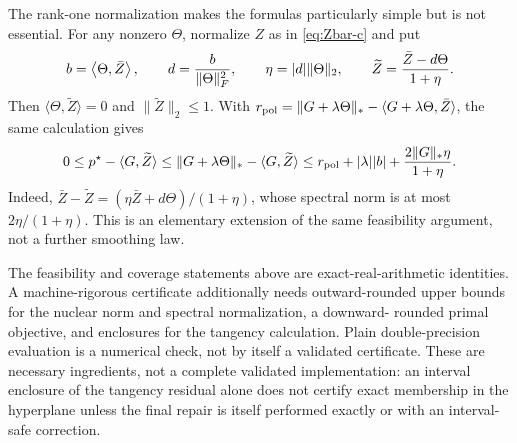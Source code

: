 \begin{remark}
\label{rem:general-normal-repair}
The rank-one normalization makes the formulas particularly simple but is
not essential.  For any nonzero \(\Theta\), normalize \(Z\) as in
\eqref{eq:Zbar-c} and put
\[
 b=\left\langle \Theta,\bar Z\right\rangle,\qquad
 d=\frac{b}{\|\Theta\|_F^2},\qquad
 \eta=|d|\|\Theta\|_2,\qquad
 \widetilde Z=\frac{\bar Z-d\Theta}{1+\eta}.
\]
Then \(\langle\Theta,\widetilde Z\rangle=0\) and
\(\|\widetilde Z\|_2\le1\).  With
\(r_{\rm pol}=\|G+\lambda\Theta\|_*
-\langle G+\lambda\Theta,\bar Z\rangle\), the same calculation gives
\[
 0\le p^\star-\langle G,\widetilde Z\rangle
 \le\|G+\lambda\Theta\|_*-\langle G,\widetilde Z\rangle
 \le r_{\rm pol}+|\lambda||b|
       +\frac{2\|G\|_*\eta}{1+\eta}.
\]
Indeed, \(\bar Z-\widetilde Z=(\eta\bar Z+d\Theta)/(1+\eta)\), whose
spectral norm is at most \(2\eta/(1+\eta)\).  This is an elementary
extension of the same feasibility argument, not a further smoothing law.
\end{remark}

\begin{boundary}
The feasibility and coverage statements above are exact-real-arithmetic
identities.  A machine-rigorous certificate additionally needs outward-rounded
upper bounds for the nuclear norm and spectral normalization, a downward-
rounded primal objective, and enclosures for the tangency calculation.  Plain
double-precision evaluation is a numerical check, not by itself a validated
certificate.  These are necessary ingredients, not a complete validated
implementation: an interval enclosure of the tangency residual alone does
not certify exact membership in the hyperplane unless the final repair is
itself performed exactly or with an interval-safe correction.
\end{boundary}


